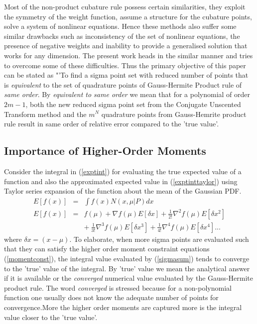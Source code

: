 \documentclass[letterpaper, 10 pt, conference]{ieeeconf}  %
\begin{document}
  \indent\indent Most of the non-product cubature rule possess certain similarities, they exploit the symmetry of the weight function, assume a structure for the cubature points, solve a system of nonlinear equations. Hence these methods also suffer some similar drawbacks such as inconsistency of the set of nonlinear equations, the presence of negative weights and inability to provide a generalised solution that works for any dimension. The present work heads in the similar manner and tries to overcome some of these difficulties. Thus the primary objective of this paper can be stated as "'To find a sigma point set with reduced number of points that is \emph{equivalent} to the set of quadrature points of Gauss-Hermite Product rule of \emph{same order}. By \emph{equivalent to same order} we mean that for a polynomial of order $2m-1$, both the new reduced sigma point set from the Conjugate Unscented Transform method and the $m^N$ quadrature points from Gauss-Hemrite product rule result in same order of relative error compared to the 'true value'.


\subsection{Importance of Higher-Order Moments}
Consider the integral in (\ref{exptint}) for evaluating the true expected value of a function and also the approximated expected value in (\ref{exptinttaylor}) using Taylor series expansion of the function about the mean of the Gaussian PDF.
\setlength{\arraycolsep}{0.0em}
\begin{eqnarray}
E[f(x)]&{}={}& \int{f(x)N(x,\mu|P)}dx \label{exptint}\\
E[f(x)]&{}={}& f(\mu)+\nabla{f(\mu)}E[\delta{x}]+\frac{1}{2!}\nabla^2f(\mu)E[\delta{x}^2]\nonumber \\ 
&&{+}\: \frac{1}{3!}\nabla^3f(\mu)E[\delta{x}^3]+\frac{1}{4!}\nabla^4f(\mu)E[\delta{x}^4]... \label{exptinttaylor}
\end{eqnarray}
\setlength{\arraycolsep}{5pt}
where $\delta{x}=(x-\mu)$. To elaborate, when more sigma points are evaluated such that they can satisfy the higher order moment constraint equations (\ref{momentconst}), the integral value evaluated by (\ref{sigmasum}) tends to converge to the 'true' value of the integral. By 'true' value we mean the analytical answer if it is available or the \emph{converged} numerical value evaluated by the Gauss-Hermite product rule. The word \emph{converged} is stressed because for a non-polynomial function one usually does not know the adequate number of points for convergence.More the  higher order moments are captured more is the integral value closer to the 'true value'.
\end{document}
